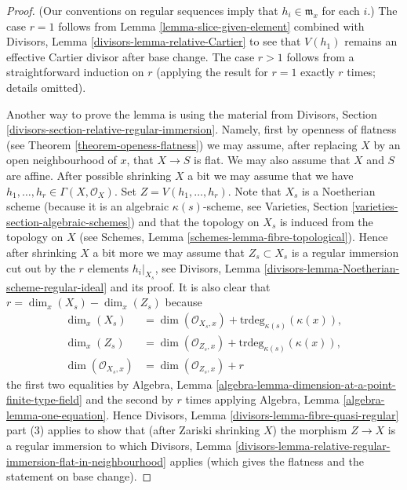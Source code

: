 \begin{proof}
(Our conventions on regular sequences imply that $h_i \in \mathfrak m_x$
for each $i$.) The case $r = 1$ follows from
Lemma \ref{lemma-slice-given-element}
combined with
Divisors, Lemma \ref{divisors-lemma-relative-Cartier}
to see that $V(h_1)$ remains an effective Cartier divisor after base change.
The case $r > 1$ follows from a straightforward induction on $r$ (applying
the result for $r = 1$ exactly $r$ times; details omitted).

\medskip\noindent
Another way to prove the lemma is using the material from
Divisors, Section \ref{divisors-section-relative-regular-immersion}.
Namely, first by openness of flatness (see
Theorem \ref{theorem-openess-flatness})
we may assume, after replacing $X$ by an
open neighbourhood of $x$, that $X \to S$ is flat.
We may also assume that $X$ and $S$ are affine.
After possible shrinking $X$ a bit we may assume that we have
$h_1, \ldots, h_r \in \Gamma(X, \mathcal{O}_X)$. Set
$Z = V(h_1, \ldots, h_r)$. Note that $X_s$ is a Noetherian scheme
(because it is an algebraic $\kappa(s)$-scheme, see
Varieties, Section \ref{varieties-section-algebraic-schemes})
and that the topology on $X_s$ is induced from the topology on $X$
(see
Schemes, Lemma \ref{schemes-lemma-fibre-topological}).
Hence after shrinking $X$ a bit more
we may assume that $Z_s \subset X_s$ is a regular immersion
cut out by the $r$ elements $h_i|_{X_s}$, see
Divisors, Lemma \ref{divisors-lemma-Noetherian-scheme-regular-ideal}
and its proof. It is also clear that $r = \dim_x(X_s) - \dim_x(Z_s)$ because
\begin{align*}
\dim_x(X_s) & = \dim(\mathcal{O}_{X_s, x}) +
\text{trdeg}_{\kappa(s)}(\kappa(x)), \\
\dim_x(Z_s) & = \dim(\mathcal{O}_{Z_s, x}) +
\text{trdeg}_{\kappa(s)}(\kappa(x)), \\
\dim(\mathcal{O}_{X_s, x}) & = \dim(\mathcal{O}_{Z_s, x}) + r
\end{align*}
the first two equalities by
Algebra, Lemma \ref{algebra-lemma-dimension-at-a-point-finite-type-field}
and the second by $r$ times applying
Algebra, Lemma \ref{algebra-lemma-one-equation}.
Hence
Divisors, Lemma \ref{divisors-lemma-fibre-quasi-regular} part (3)
applies to show that (after Zariski shrinking $X$) the morphism
$Z \to X$ is a regular immersion to which
Divisors, Lemma
\ref{divisors-lemma-relative-regular-immersion-flat-in-neighbourhood}
applies (which gives the flatness and the statement on base change).
\end{proof}

